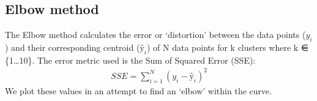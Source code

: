 \documentclass[letterpaper,10pt,english]{jupyterBook}
\begin{document}
\subsection{Elbow method}
\label{\detokenize{Clustering_Analysis:elbow-method}}
\sphinxAtStartPar
The Elbow method calculates the error or ‘distortion’ between the data points (\(y_{i}\)) and their corresponding centroid (\(ŷ_{i}\)) of N data points for k clusters where k ⋹ \{1…10\}. The error metric used is the Sum of Squared Error (SSE):
\begin{equation*}
\begin{split}
SSE = \sum_{i=1}^{N} {(y_i - ŷ_i)^2}
\end{split}
\end{equation*}
\sphinxAtStartPar
We plot these values in an attempt to find an ‘elbow’ within the curve.
\end{document}
